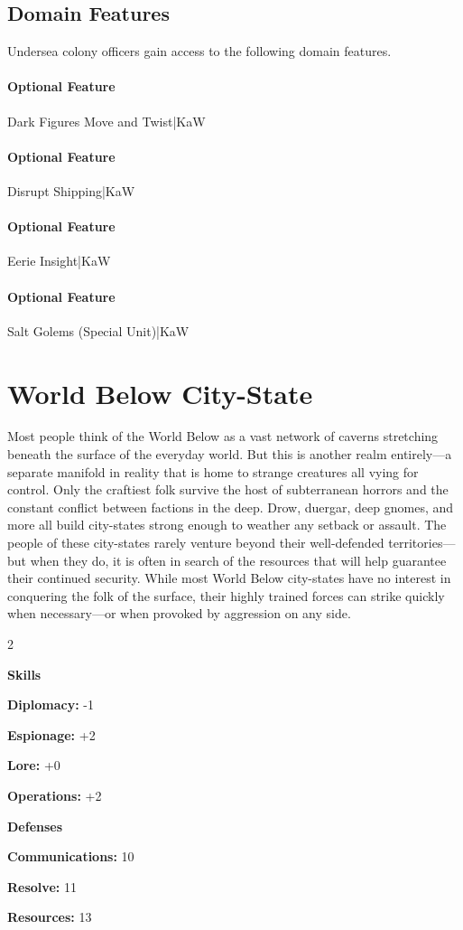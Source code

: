 \documentclass[10pt,a4paper,twoside,bg=print,twocolumn,openany,nodeprecatedcode]{dndbook}
\begin{document}
\subsection{Domain Features}
Undersea colony officers gain access to the following domain features.

\paragraph{Optional Feature}
Dark Figures Move and Twist|KaW

\paragraph{Optional Feature}
Disrupt Shipping|KaW

\paragraph{Optional Feature}
Eerie Insight|KaW

\paragraph{Optional Feature}
Salt Golems (Special Unit)|KaW

\section{World Below City-State }
Most people think of the World Below as a vast network of caverns stretching beneath the surface of the everyday world. But this is another realm entirely—a separate manifold in reality that is home to strange creatures all vying for control. Only the craftiest folk survive the host of subterranean horrors and the constant conflict between factions in the deep. Drow, duergar, deep gnomes, and more all build city-states strong enough to weather any setback or assault. The people of these city-states rarely venture beyond their well-defended territories—but when they do, it is often in search of the resources that will help guarantee their continued security. While most World Below city-states have no interest in conquering the folk of the surface, their highly trained forces can strike quickly when necessary—or when provoked by aggression on any side.


\begin{itemize}
\begin{multicols}{2}
\item \textbf{Skills}
\item \textbf{Diplomacy:} -1
\item \textbf{Espionage:} +2
\item \textbf{Lore:} +0
\item \textbf{Operations:} +2
\item \textbf{Defenses}
\item \textbf{Communications:} 10
\item \textbf{Resolve:} 11
\item \textbf{Resources:} 13
\end{multicols}

\end{itemize}
\end{document}
